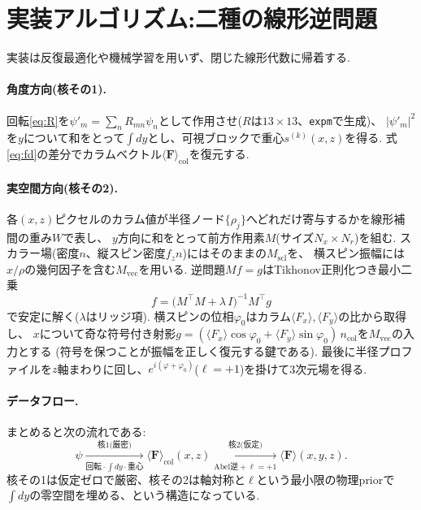 \documentclass[11pt]{ltjsarticle}
\newcommand{\Fv}{\bm{F}}
\newcommand{\expv}[1]{\langle #1 \rangle}
\begin{document}
\section{実装アルゴリズム:二種の線形逆問題}
\label{sec:impl}

実装は反復最適化や機械学習を用いず、閉じた線形代数に帰着する.

\paragraph{角度方向(核その1).}
回転\eqref{eq:R}を$\psi'_m=\sum_n R_{mn}\psi_n$として作用させ($R$は$13\times13$、\texttt{expm}で生成)、
$|\psi'_m|^2$を$y$について和をとって$\int dy$とし、可視ブロックで重心$s^{(k)}(x,z)$を得る.
式\eqref{eq:fd}の差分でカラムベクトル$\expv{\Fv}_{\mathrm{col}}$を復元する.

\paragraph{実空間方向(核その2).}
各$(x,z)$ピクセルのカラム値が半径ノード$\{\rho_j\}$へどれだけ寄与するかを線形補間の重み$W$で表し、
$y$方向に和をとって前方作用素$M$(サイズ$N_x\times N_r$)を組む.
スカラー場(密度$n$、縦スピン密度$f_z n$)にはそのままの$M_{\mathrm{scl}}$を、
横スピン振幅には$x/\rho$の幾何因子を含む$M_{\mathrm{vec}}$を用いる.
逆問題$Mf=g$はTikhonov正則化つき最小二乗
\begin{equation}
  f=\bigl(M^{\!\top}M+\lambda\,I\bigr)^{-1}M^{\!\top}g
  \label{eq:tikhonov}
\end{equation}
で安定に解く($\lambda$はリッジ項).
横スピンの位相$\varphi_0$はカラム$\expv{F_x},\expv{F_y}$の比から取得し、
$x$について奇な符号付き射影$g=(\expv{F_x}\cos\varphi_0+\expv{F_y}\sin\varphi_0)\,n_{\mathrm{col}}$を$M_{\mathrm{vec}}$の入力とする
(符号を保つことが振幅を正しく復元する鍵である).
最後に半径プロファイルを$z$軸まわりに回し、$e^{i(\varphi+\varphi_0)}$($\ell=+1$)を掛けて3次元場を得る.

\paragraph{データフロー.}
まとめると次の流れである:
\begin{equation}
  \psi
  \xrightarrow[\text{回転}\cdot\int dy\cdot\text{重心}]{\text{核1(厳密)}}
  \expv{\Fv}_{\mathrm{col}}(x,z)
  \xrightarrow[\text{Abel逆}+\ell=+1]{\text{核2(仮定)}}
  \expv{\Fv}(x,y,z).
\end{equation}
核その1は仮定ゼロで厳密、核その2は軸対称と$\ell$という最小限の物理priorで$\int dy$の零空間を埋める、という構造になっている.
\end{document}
